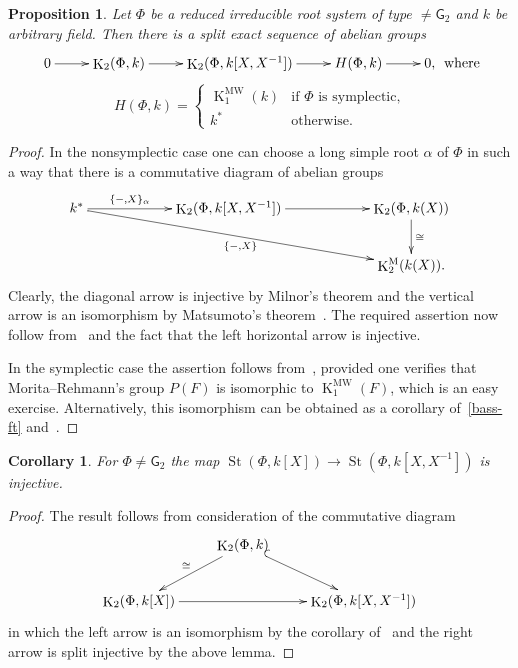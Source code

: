 \documentclass[oneside, 10pt]{amsart}
\newtheorem{prop}{Proposition}
\newtheorem{corollary}{Corollary}
\theoremstyle{remark}
\theoremstyle{definition}
\DeclareMathOperator{\St}{St}
\DeclareMathOperator{\K}{K}
\newcommand{\rG}{\mathsf{G}}
\numberwithin{equation}{section}
\begin{document}
\begin{prop} Let $\Phi$ be a reduced irreducible root system of type $\neq \rG_2$ and $k$ be arbitrary field.
Then there is a split exact sequence of abelian groups
\[ \xymatrix{ 0 \ar[r] & \K_2(\Phi, k) \ar[r] & \K_2(\Phi, k[X, X^{-1}]) \ar[r] & H(\Phi, k) \ar[r] & 0,}\text{ where} \]
\[ H(\Phi, k) = \left\{\begin{array}{ll} \K_1^\mathrm{MW}(k)& \text{if $\Phi$ is symplectic,}\\ k^* & \text{otherwise.}  \end{array}\right. \]  \end{prop}
\begin{proof} In the nonsymplectic case one can choose a long simple root $\alpha$ of $\Phi$ in such a way that there is a commutative diagram of abelian groups
\[\xymatrixcolsep{5pc}\xymatrix{k^* \ar[r]^-{\{ -, X \}_{\alpha}} \ar[rrd]_{\{-, X\}} & \K_2(\Phi, k[X, X^{-1}]) \ar[r] & \K_2(\Phi, k(X)) \ar[d]^{\cong} \\
                                                                                      &                                 & \K_2^\mathrm{M}(k(X)).} \]
Clearly, the diagonal arrow is injective by Milnor's theorem and the vertical arrow is an isomorphism by Matsumoto's theorem~\cite[Theorem~5.10]{Ma69}.
The required assertion now follow from~\cite[Satz~3]{Hur77} and the fact that the left horizontal arrow is injective.

In the symplectic case the assertion follows from~\cite[Theorem~B]{MR91}, provided one verifies that Morita--Rehmann's group $P(F)$ is isomorphic to $\K_1^\mathrm{MW}(F)$,
 which is an easy exercise. Alternatively, this isomorphism can be obtained as a corollary of~\cref{bass-ft} and~\cite[Lemma~4.1.1]{AF17}. \end{proof}
 
\begin{corollary} \label{field-injectivity} For $\Phi\neq\rG_2$ the map $\St(\Phi, k[X]) \to \St(\Phi, k[X, X^{-1}])$ is injective. \end{corollary}
\begin{proof} The result follows from consideration of the commutative diagram
\[\xymatrix{ & \K_2(\Phi, k) \ar[dl]_{\cong} \ar@{^{(}->}[dr] & \\
               \K_2(\Phi, k[X]) \ar[rr] &               & \K_2(\Phi, k[X, X^{-1}])} \]
in which the left arrow is an isomorphism by the corollary of~\cite[Satz~1]{Re75} and the right arrow is split injective by the above lemma. \end{proof}
\end{document}

